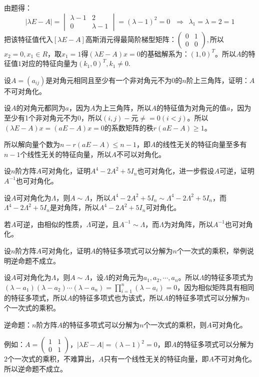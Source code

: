 \documentclass[a4paper]{report}
\begin{document}
\begin{jie}
由题得：
\begin{equation*}
|\lambda E-A|=
\begin{vmatrix}
\lambda-1&2\\
0&\lambda-1
\end{vmatrix}=(\lambda-1)^2=0~~~\Rightarrow~~\lambda_1=\lambda=2=1
\end{equation*}
把该特征值代入$[\lambda E-A]$高斯消元得最简阶梯型矩阵：$
\begin{pmatrix}
0&1\\0&0
\end{pmatrix},
$所以$x_2=0,x_1\in R$，取$x_1=1$得$(\lambda E-A)x=0$的基础解系为：$(1,0)^T$。所以$A$的特征值$1$对应的特征向量为$(k_1,0)^T,k_1\neq 0$.
\end{jie}

\EX 设$A=(a_{ij})$是对角元相同且至少有一个非对角元不为0的$n$阶上三角阵，证明：$A$不可对角化。

\begin{zhengming}
设$A$的对角元都同为$a$，因为$A$为上三角阵，所以$A$的特征值为对角元的值$a$，因为至少有1个非对角元不为0，所以$(i,j)-$元$\neq=0(i<j)$。所以$(\lambda E-A)x=(aE-A)x=0$的系数矩阵的秩$r(aE-A)\geq 1$。

所以解向量个数为$n-r(aE-A)\leq n-1$，即$A$的线性无关的特征向量至多有$n-1$个线性无关的特征向量，所以$A$不可以对角化。
\end{zhengming}

\EX 设$n$阶方阵$A$可对角化，证明$A^4-2A^2+5I_{n}$也可对角化，进一步假设$A$可逆，证明$A^{-1}$也可对角化。

\begin{zhengming}
设$A$可对角化为$\Lambda$，则$A\sim \Lambda$，所以$A^4-2A^2+5I_n\sim \Lambda^4-2\Lambda^2+5I_n$，而$\Lambda^4-2\Lambda^2+5I_n$是对角阵，所以$A^4-2A^2+5I_{n}$可对角化。

若$A$可逆，由相似的性质，$\Lambda$可逆，且$A^{-1}\sim \Lambda$，而$\Lambda$为对角阵，所以$A^{-1}$也可对角化。
\end{zhengming}

\EX 设$n$阶方阵$A$可对角化，证明$A$的特征多项式可以分解为$n$个一次式的乘积，举例说明逆命题不成立。

\begin{zhengming}
设$A$可对角化为$\Lambda$，则$A\sim \Lambda$，设$\Lambda$的对角元为$a_1,a_2,\cdots,a_n$。所以$\Lambda$的特征多项式为$(\lambda-a_1)(\lambda-a_2)\cdots(\lambda-a_n)=\prod\limits_{i=1}^{n}(\lambda-a_i)=0$，因为相似矩阵具有相同的特征多项式，所以$A$的特征多项式也为该式，所以$A$的特征多项式可以分解为$n$个一次式的乘积。

逆命题：$n$阶方阵$A$的特征多项式可以分解为$n$个一次式的乘积，则$A$可对角化。

例如：$A=
\begin{pmatrix}
1&1\\0&1
\end{pmatrix}
$，$|\lambda E-A|=(\lambda-1)^2=0$，即$A$的特征多项式可以分解为$2$个一次式的乘积，不难算出，$A$只有一个线性无关的特征向量，即$A$不可对角化。所以逆命题不成立。
\end{zhengming}
\end{document}
